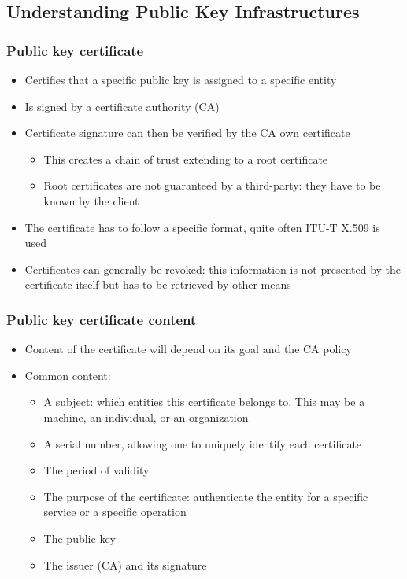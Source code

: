 \subsection{Understanding Public Key Infrastructures}

\begin{frame}
  \frametitle{Public key certificate}
  \begin{itemize}
    \item Certifies that a specific public key is assigned to a specific entity
    \item Is signed by a certificate authority (CA)
    \item Certificate signature can then be verified by the CA own certificate
      \begin{itemize}
        \item This creates a chain of trust extending to a root certificate
        \item Root certificates are not guaranteed by a third-party: they have to be
          known by the client
      \end{itemize}
    \item The certificate has to follow a specific format, quite often ITU-T X.509
      is used
    \item Certificates can generally be revoked: this information is not presented
      by the certificate itself but has to be retrieved by other means
  \end{itemize}
\end{frame}

\begin{frame}
  \frametitle{Public key certificate content}
  \begin{itemize}
    \item Content of the certificate will depend on its goal and the CA policy
    \item Common content:
      \begin{itemize}
        \item A subject: which entities this certificate belongs to. This may be
          a machine, an individual, or an organization
        \item A serial number, allowing one to uniquely identify each
          certificate
        \item The period of validity
        \item The purpose of the certificate: authenticate the entity for a specific
          service or a specific operation
        \item The public key
        \item The issuer (CA) and its signature
      \end{itemize}
  \end{itemize}
\end{frame}


